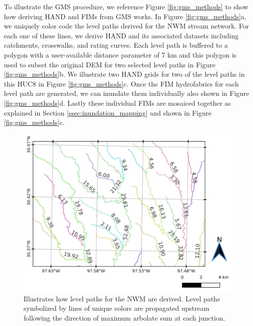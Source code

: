 \documentclass[draft]{dependencies/agujournal2019}
\begin{document}
To illustrate the GMS procedure, we reference Figure \ref{fig:gms_methods} to show how deriving HAND and FIMs from GMS works.
In Figure \ref{fig:gms_methods}a, we uniquely color code the level paths derived for the NWM stream network. 
For each one of these lines, we derive HAND and its associated datasets including catchments, crosswalks, and rating curves.
Each level path is buffered to a polygon with a user-available distance parameter of 7 km and this polygon is used to subset the original DEM for two selected level paths in Figure \ref{fig:gms_methods}b.
We illustrate two HAND grids for two of the level paths in this HUC8 in Figure \ref{fig:gms_methods}c.
Once the FIM hydrofabrics for each level path are generated, we can inundate them individually also shown in Figure \ref{fig:gms_methods}d.
Lastly these individual FIMs are mosaiced together as explained in Section \ref{ssec:inundation_mapping} and shown in Figure \ref{fig:gms_methods}c.
%
\begin{figure}[h!]
\centering
\includegraphics[scale=1.0]{figures/level_path_methods.jpg}
\caption{Illustrates how level paths for the NWM are derived.
Level paths symbolized by lines of unique colors are propagated upstream following the direction of maximum arbolate sum at each junction.
}
\label{fig:level_path_methods}
\end{figure}
%
%
\end{document}
